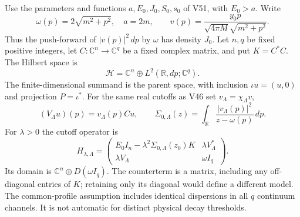 \documentclass[11pt]{article}
\theoremstyle{remark}
\begin{document}
Use the parameters and functions \(a,E_0,J_0,S_0,s_0\) of V51,
with \(E_0>a\).  Write
\[
 \omega(p)=2\sqrt{m^2+p^2},\quad a=2m,\qquad
 v(p)=\frac{y_0p}{\sqrt{4\pi M}\sqrt{m^2+p^2}}.
\]
Thus the push-forward of \(|v(p)|^2\,dp\) by \(\omega\)
has density \(J_0\).  Let \(n,q\) be fixed positive integers,
let \(C:\mathbb C^n\to\mathbb C^q\) be a fixed complex matrix,
and put \(K=C^*C\).  The Hilbert space is
\[
 \mathcal H=\mathbb C^n\oplus L^2(\mathbb R,dp;\mathbb C^q).
\]
The finite-dimensional summand is the parent space, with inclusion
\(\iota u=(u,0)\) and projection \(P=\iota^*\).
For the same real cutoffs as V46 set \(v_\Lambda=\chi_\Lambda v\),
\[
 (V_\Lambda u)(p)=v_\Lambda(p)Cu,\qquad
 \Sigma_{0,\Lambda}(z)=\int_{\mathbb R}
             \frac{|v_\Lambda(p)|^2}{z-\omega(p)}\,dp .
\]
For \(\lambda>0\) the cutoff operator is
\[
 H_{\lambda,\Lambda}=
 \begin{pmatrix}
 E_0I_n-\lambda^2\Sigma_{0,\Lambda}(z_0)K&
 \lambda V_\Lambda^*\\
 \lambda V_\Lambda&\omega I_q
 \end{pmatrix}.
\]
Its domain is \(\mathbb C^n\oplus D(\omega I_q)\).
The counterterm is a matrix, including any off-diagonal entries of
\(K\); retaining only its diagonal would define a different model.
The common-profile assumption includes identical dispersions in all
\(q\) continuum channels.  It is not automatic for distinct physical
decay thresholds.
\end{document}
